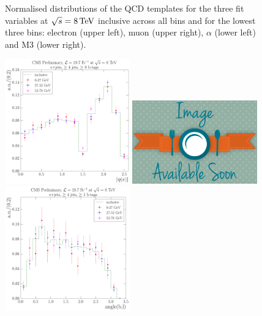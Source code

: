 \begin{figure}[hbtp]
	 \caption{Normalised distributions of the QCD templates for the three fit variables at $\sqrt{s}=8\,\text{Te\hspace{-.08em}V}$
	 inclusive across all \mt bins and for the lowest three \mt bins: electron \abseta (upper
	 left), muon \abseta (upper right), $\alpha$ (lower left) and M3 (lower right).}
     \label{fig:MT_fit_variable_qcd_comparisons_8TeV}
\end{figure}

\begin{figure}[hbtp]
    \centering
     \includegraphics[width=0.48\textwidth]{Chapters/04_Analysis/04b_XSections/images/8TeV/fit_variables/WPT/electron_absolute_eta/qcd/WPT_electron_absolute_eta_0orMoreBtag_QCD_template_comparison.pdf}\hfill
     \includegraphics[width=0.48\textwidth]{Chapters/04_Analysis/04b_XSections/images/placeholder.png}\hfill
     \includegraphics[width=0.48\textwidth]{Chapters/04_Analysis/04b_XSections/images/8TeV/fit_variables/WPT/angle_bl/qcd/WPT_angle_bl_1orMoreBtag_QCD_template_comparison.pdf}\hfill

\end{figure}
